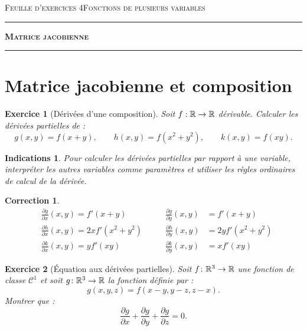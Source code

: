 \documentclass[11pt,a4paper]{article}
\theoremstyle{exostyle}
\newtheorem{exo}{Exercice}
\newtheorem{ind}{Indications}
\newtheorem{cor}{Correction}
\newcommand{\exercice}[1]{} \newcommand{\finexercice}{}
\newcommand{\enonce}{\begin{exo}} \newcommand{\finenonce}{\end{exo}}
\newcommand{\indication}{\begin{ind}} \newcommand{\finindication}{\end{ind}}
\newcommand{\correction}{\begin{cor}} \newcommand{\fincorrection}{\end{cor}}
\begin{document}
	
	


\textsc{Feuille d'exercices 4}\hfill\textsc{Fonctions de plusieurs variables}

\vspace*{0.5ex}
\hrule\vspace*{1.5ex} 
\hfil{\textbf{\Large \textsc{Matrice jacobienne}}}
\vspace*{1ex} \hrule 
\vspace*{5ex} 




\section{Matrice jacobienne et composition}


\exercice{1801, ridde, 1999/11/01}

\exercice{}
\enonce[Dérivées d'une composition]
Soit $f : \mathbb{R} \rightarrow
\mathbb{R}$ dérivable. Calculer les dérivées partielles de :
\[
g (x, y) = f (x + y),
\qquad h (x, y) = f (x^{2} + y^{2}),
\qquad k (x, y) = f (xy).
\]
\finenonce

\indication 
Pour calculer les  dérivées partielles par rapport 
à une variable, interpréter les autres variables comme paramètres
et utiliser les règles ordinaires de calcul de la dérivée.
\finindication

\correction
\begin{align*}
	&\frac{\partial g}{\partial x}(x,y) = f'(x+y)
	&\qquad\frac{\partial g}{\partial y}(x,y) &= f'(x+y) \\
	&\frac{\partial h}{\partial x}(x,y) = 2x f'(x^{2} + y^{2})
	&\qquad\frac{\partial h}{\partial y}(x,y) &= 2y f'(x^{2} + y^{2}) \\
	&\frac{\partial k}{\partial x}(x,y)= yf'(xy) 
	&\qquad\frac{\partial k}{\partial y}(x,y)&= xf'(xy)
\end{align*}	

\fincorrection

\finexercice


\exercice{2626, debievre, 2009/05/19}
\enonce[Équation aux dérivées partielles]
Soit $f\colon\mathbb{R}^3 \rightarrow \mathbb{R}$ une fonction de classe $\mathcal{C}^1$
et soit  $g\colon \mathbb{R}^3 \rightarrow \mathbb{R}$ la fonction définie par :
\[
g(x,y,z) = f(x-y,y-z,z-x). 
\]
Montrer que :
\begin{equation*}
	\frac{\partial g}{\partial x}  + \frac{\partial g}{\partial y}  + \frac{\partial g}{\partial z} = 0.
	\label{ex3}
\end{equation*}
\finenonce
\end{document}
